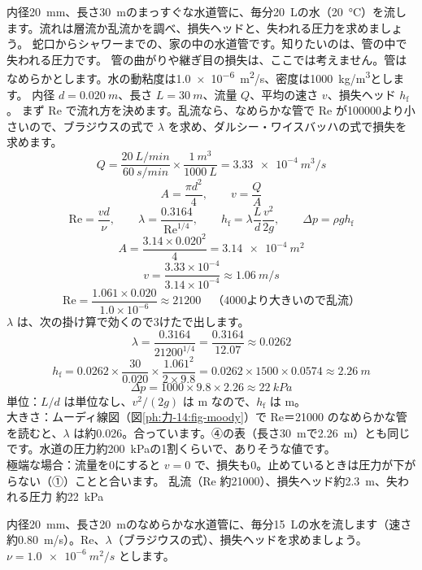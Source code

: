 \begin{phreidai}[家の水道管の損失]\label{ph:力-14:ex1}
内径\qty{20}{mm}、長さ\qty{30}{m}のまっすぐな水道管に、毎分\qty{20}{L}の水（\qty{20}{\celsius}）を流します。流れは層流か乱流かを調べ、損失ヘッドと、失われる圧力を求めましょう。
\phbamen
蛇口からシャワーまでの、家の中の水道管です。知りたいのは、管の中で失われる圧力です。
\phmushi
管の曲がりや継ぎ目の損失は、ここでは考えません。管はなめらかとします。水の動粘度は\qty{1.0e-6}{m^2/s}、密度は\qty{1000}{kg/m^3}とします。
\phzu
内径 $d=\qty{0.020}{m}$、長さ $L=\qty{30}{m}$、流量 $Q$、平均の速さ $v$、損失ヘッド $h_{\mathrm f}$。
\phriyu
まず Re で流れ方を決めます。乱流なら、なめらかな管で Re が\num{100000}より小さいので、ブラジウスの式で $\lambda$ を求め、ダルシー・ワイスバッハの式で損失を求めます。
\phtateru
\[Q=\frac{\qty{20}{L/min}}{\qty{60}{s/min}}\times\frac{\qty{1}{m^3}}{\qty{1000}{L}}=\qty{3.33e-4}{m^3/s}\]
\[A=\frac{\pi d^2}{4},\qquad v=\frac{Q}{A}\]
\[\mathrm{Re}=\frac{vd}{\nu},\qquad\lambda=\frac{0.3164}{\mathrm{Re}^{1/4}},\qquad h_{\mathrm f}=\lambda\frac{L}{d}\frac{v^2}{2g},\qquad\Delta p=\rho gh_{\mathrm f}\]
\phtoku
\[A=\frac{3.14\times0.020^2}{4}=\qty{3.14e-4}{m^2}\]
\[v=\frac{3.33\times10^{-4}}{3.14\times10^{-4}}\approx\qty{1.06}{m/s}\]
\[\mathrm{Re}=\frac{1.061\times0.020}{1.0\times10^{-6}}\approx\num{21200}\quad\text{（4000より大きいので乱流）}\]
$\lambda$ は、次の掛け算で効くので3けたで出します。
\[\lambda=\frac{0.3164}{\num{21200}^{1/4}}=\frac{0.3164}{12.07}\approx0.0262\]
\[h_{\mathrm f}=0.0262\times\frac{30}{0.020}\times\frac{1.061^2}{2\times9.8}=0.0262\times1500\times0.0574\approx\qty{2.26}{m}\]
\[\Delta p=1000\times9.8\times2.26\approx\qty{22}{kPa}\]
\phtashikame
単位：$L/d$ は単位なし、$v^2/(2g)$ は m なので、$h_{\mathrm f}$ は m。\\
大きさ：ムーディ線図（図\ref{ph:力-14:fig-moody}）で Re＝\num{21000} のなめらかな管を読むと、$\lambda$ は約0.026。合っています。④の表（長さ\qty{30}{m}で\qty{2.26}{m}）とも同じです。水道の圧力約\qty{200}{kPa}の1割くらいで、ありそうな値です。\\
極端な場合：流量を0にすると $v=0$ で、損失も0。止めているときは圧力が下がらない（①）ことと合います。
\kotae 乱流（Re 約\num{21000}）、損失ヘッド約\qty{2.3}{m}、失われる圧力 約\qty{22}{kPa}
\end{phreidai}
\begin{jibun}
内径\qty{20}{mm}、長さ\qty{20}{m}のなめらかな水道管に、毎分\qty{15}{L}の水を流します（速さ約\qty{0.80}{m/s}）。Re、$\lambda$（ブラジウスの式）、損失ヘッドを求めましょう。$\nu=\qty{1.0e-6}{m^2/s}$ とします。
\end{jibun}


